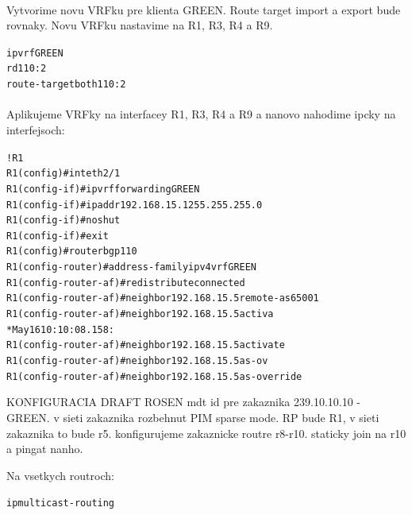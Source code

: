 \documentclass[12pt,twoside,a4paper]{report}
\begin{document}
\paragraph{}
Vytvorime novu VRFku pre klienta GREEN. Route target import a export bude rovnaky. Novu VRFku nastavime na R1, R3, R4 a R9.

\noindent
{\selectfont
\begin{small}
\begin{alltt}
ip vrf GREEN
  rd 110:2
  route-target both 110:2
\end{alltt}
\end{small}
}

\paragraph{}
Aplikujeme VRFky na interfacey R1, R3, R4 a R9 a nanovo nahodime ipcky na interfejsoch:

\noindent
{\selectfont
\begin{small}
\begin{alltt}
!R1
R1(config)#int eth2/1
R1(config-if)#ip vrf forwarding GREEN
R1(config-if)#ip addr 192.168.15.1 255.255.255.0
R1(config-if)#no shut
R1(config-if)#exit
R1(config)#router bgp 110          
R1(config-router)#address-family ipv4 vrf GREEN
R1(config-router-af)#redistribute connected
R1(config-router-af)#neighbor 192.168.15.5 remote-as 65001
R1(config-router-af)#neighbor 192.168.15.5 activa         
*May 16 10:10:08.158: %
R1(config-router-af)#neighbor 192.168.15.5 activate
R1(config-router-af)#neighbor 192.168.15.5 as-ov   
R1(config-router-af)#neighbor 192.168.15.5 as-override
\end{alltt}
\end{small}
}



KONFIGURACIA DRAFT ROSEN
mdt id pre zakaznika 239.10.10.10 - GREEN. v sieti zakaznika rozbehnut PIM sparse mode. RP bude R1, v sieti zakaznika to bude r5. konfigurujeme zakaznicke routre r8-r10. staticky join na r10 a pingat nanho.


Na vsetkych routroch:
\noindent
{\selectfont
\begin{small}
\begin{alltt}
ip multicast-routing
\end{alltt}
\end{small}
}
\end{document}
